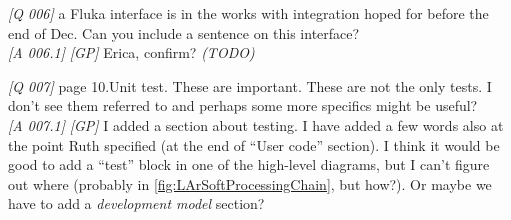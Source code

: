 \emph{{[}Q 006{]}} a Fluka interface is in the works with integration
hoped for before the end of Dec. Can you include a sentence on this
interface?\\
\emph{{[}A 006.1{]}} \emph{{[}GP{]}} Erica, confirm? \emph{(TODO)}

\emph{{[}Q 007{]}} page 10.Unit test. These are important. These are not
the only tests. I don't see them referred to and perhaps some more
specifics might be useful?\\
\emph{{[}A 007.1{]}} \emph{{[}GP{]}} I added a section about testing. I
have added a few words also at the point Ruth specified (at the end of
``User code'' section). I think it would be good to add a ``test'' block
in one of the high-level diagrams, but I can't figure out where
(probably in \ref{fig:LArSoftProcessingChain}, but how?). Or maybe we
have to add a \emph{development model} section?

